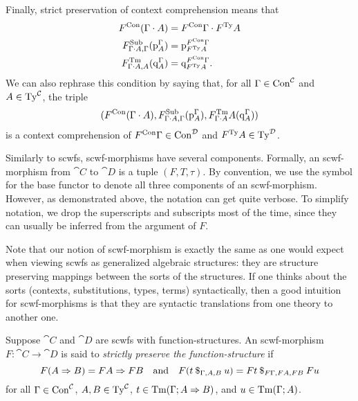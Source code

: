\begin{enum}
    \item Finally, strict preservation of context comprehension means that
    \begin{align*}
    \scwfmorcon*{F}(\Sextcon{\Gamma}{A})
        &= \Sextcon{\scwfmorcon*{F}\Gamma}{\scwfmorty*{F}A} \\
    \scwfmorsub*{F}{\Sextcon{\Gamma}{A}}{\Gamma}(\Spsub[\Gamma][A])
        &= \Spsub[\scwfmorcon*{F}\Gamma][\scwfmorty*{F}A] \\
    \scwfmortm*{F}[\Sextcon{\Gamma}{A}]{A}(\Sq[\Gamma][A])
        &= \Sq[\scwfmorcon*{F}\Gamma][\scwfmorty*{F}A].
    \end{align*}
    We can also rephrase this condition by saying that, for all $\Gamma \in \SCon[\cat{C}]$ and $A \in \STy[\cat{C}]$, the triple
    \[ (\scwfmorcon*{F}(\Sextcon{\Gamma}{A}),
        \scwfmorsub*{F}{\Sextcon{\Gamma}{A}}{\Gamma}(\Spsub[\Gamma][A]),
        \scwfmortm*{F}{\Sextcon{\Gamma}{A}}{A}(\Sq[\Gamma][A])) \]
    is a context comprehension of $\scwfmorcon*{F}\Gamma \in \SCon[\cat{D}]$ and $\scwfmorty*{F}A \in \STy[\cat{D}]$.
\end{enum}

Similarly to scwfs, scwf-morphisms have several components. Formally, an scwf-morphism from $\cat{C}$ to $\cat{D}$ is a tuple $(F, T, \tau)$. By convention, we use the symbol for the base functor to denote all three components of an scwf-morphism. However, as demonstrated above, the notation can get quite verbose. To simplify notation, we drop the superscripts and subscripts most of the time, since they can usually be inferred from the argument of $F$.

Note that our notion of scwf-morphism is exactly the same as one would expect when viewing scwfs as generalized algebraic structures: they are structure preserving mappings between the sorts of the structures. If one thinks about the sorts (contexts, substitutions, types, terms) syntactically, then a good intuition for scwf-morphisms is that they are syntactic translations from one theory to another one.

\begin{defn} \label{def:scwf-morphism-preserves-function-structure}
Suppose $\cat{C}$ and $\cat{D}$ are scwfs with function-structures. An scwf-morphism $F : \cat{C} \to \cat{D}$ is said to \emph{strictly preserve the function-structure} if
\[ F(\Sfuncty{A}{B}) = \Sfuncty{FA}{FB} \quad\text{and}\quad
    F(\Sapp[\Gamma,A,B]{t}{u}) = \Sapp[F\Gamma,FA,FB]{Ft}{Fu} \]
for all $\Gamma \in \SCon[\cat{C}]$, $A, B \in \STy[\cat{C}]$, $t \in \STm[\Gamma]{\Sfuncty{A}{B}}$, and $u \in \STm[\Gamma]{A}$.
\end{defn}

